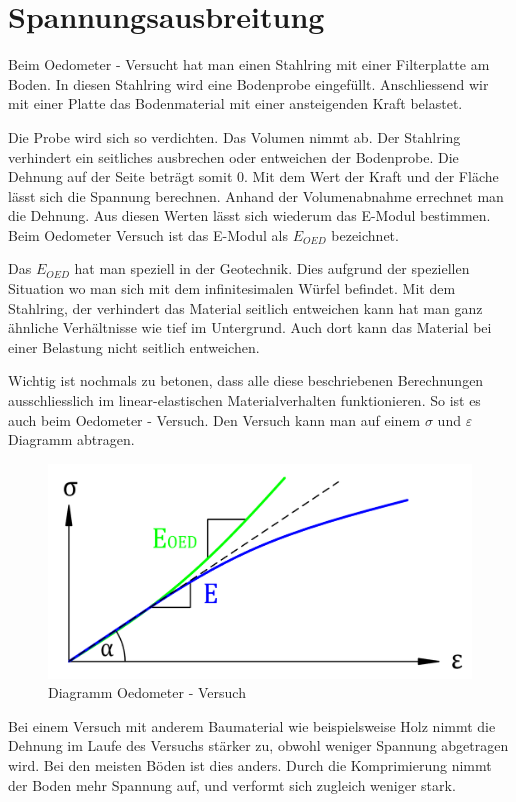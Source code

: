 \section{Spannungsausbreitung\label{spannung:section:Oedometer - Versuch}}
Beim Oedometer - Versucht hat man einen Stahlring mit einer Filterplatte am Boden.
In diesen Stahlring wird eine Bodenprobe eingefüllt.
Anschliessend wir mit einer Platte das Bodenmaterial mit einer ansteigenden Kraft belastet.

Die Probe wird sich so verdichten. Das Volumen nimmt ab.
Der Stahlring verhindert ein seitliches ausbrechen oder entweichen der Bodenprobe.
Die Dehnung auf der Seite beträgt somit 0.
Mit dem Wert der Kraft und der Fläche lässt sich die Spannung berechnen.
Anhand der Volumenabnahme errechnet man die Dehnung.
Aus diesen Werten lässt sich wiederum das E-Modul bestimmen.
Beim Oedometer Versuch ist das E-Modul als $E_{OED}$ bezeichnet.

Das $E_{OED}$ hat man speziell in der Geotechnik.
Dies aufgrund der speziellen Situation wo man sich mit dem infinitesimalen Würfel befindet.
Mit dem Stahlring, der verhindert das Material seitlich entweichen kann hat man ganz ähnliche Verhältnisse wie tief im Untergrund.
Auch dort kann das Material bei einer Belastung nicht seitlich entweichen.

Wichtig ist nochmals zu betonen, dass alle diese beschriebenen Berechnungen ausschliesslich im linear-elastischen Materialverhalten funktionieren.
So ist es auch beim Oedometer - Versuch.
Den Versuch kann man auf einem $\sigma$ und $\varepsilon$ Diagramm abtragen.

\begin{figure}
	\centering
	\includegraphics[width=0.5\linewidth,keepaspectratio]{papers/spannung/Grafiken/DiagrammOedometer-Versuch.png}
	\caption{Diagramm Oedometer - Versuch}
	\label{fig:Diagramm Oedometer - Versuch}
\end{figure}

Bei einem Versuch mit anderem Baumaterial wie beispielsweise Holz nimmt die Dehnung im Laufe des Versuchs stärker zu, obwohl weniger Spannung abgetragen wird.
Bei den meisten Böden ist dies anders. Durch die Komprimierung nimmt der Boden mehr Spannung auf, und verformt sich zugleich weniger stark.


